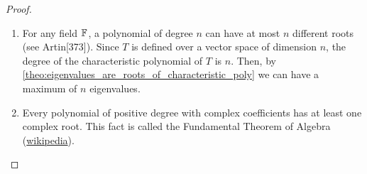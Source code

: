 \documentclass[../MathsNotesBase.tex]{subfiles}
\begin{document}
{		\medskip{}
		
		\bigskip
		\begin{proof}\nl
			\begin{enumerate}[label=(\roman*)]
				\item{For any field $\mathbb{F}^{}$, a polynomial of degree $n$ can have at most $n$ different roots (see Artin[373]). Since $T$ is defined over a vector space of dimension $n$, the degree of the characteristic polynomial of $T$ is $n$. Then, by \autoref{theo:eigenvalues_are_roots_of_characteristic_poly} we can have a maximum of $n$ eigenvalues.}
				\item{Every polynomial of positive degree with complex coefficients has at least one complex root. This fact is called the Fundamental Theorem of Algebra (\href{https://en.wikipedia.org/wiki/Fundamental_theorem_of_algebra}{wikipedia}).}
			\end{enumerate}
		\end{proof}
	
}
\end{document}
